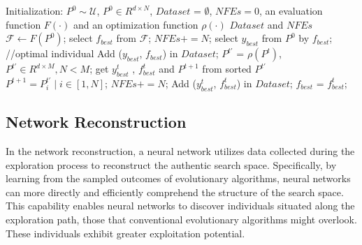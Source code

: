 \documentclass[journal,twoside]{IEEEtran}
\begin{document}
\begin{algorithm}[t]
	\caption{\textcolor{blue}{Exploration Sampling}} 
	\label{exploration} 
	\renewcommand{\algorithmicrequire}{\textbf{Input:}}
	\renewcommand{\algorithmicensure}{\textbf{Output:}}
	\begin{algorithmic}[1]
		\REQUIRE Initialization: $P^{0} \sim \mathcal{U}$, $P^{0} \in R^{d \times N}$, $Dataset$ = $\emptyset$, $N\!F\!E\!s = 0$, an evaluation function $F(\cdot)$ and an optimization function $\rho(\cdot)$
		\ENSURE $Dataset$ and $N\!F\!E\!s$
		\STATE $\mathcal{F} \leftarrow F(P^{0})$; 
		\STATE select $f_{best}$ from $\mathcal{F}$;
		\STATE $N\!F\!E\!s += N$;
		\STATE select $y_{best}$ from $P^{0}$ by $f_{best}$; //optimal individual 
		\STATE Add ($y_{best}$, $f_{best}$) in $Dataset$;
		\STATE $P^{t'}$ = $\rho(P^{t})$, $P^{t'} \in R^{d \times M}, N<M$;
		\STATE get $y_{best}^{t}$ , $f_{best}^{t}$ and $P^{t+1}$ from sorted $P^{t'}$\\ 
		$P^{t+1} = {P^{t'}_{i} \mid i \in [1, N]}$;
		\STATE	$N\!F\!E\!s += N$;
		\STATE	Add ($y^{t}_{best}$, $f^{t}_{best}$) in $Dataset$;
		\STATE  $f_{best}$ = $f_{best}^{t}$;
		\ENDIF	
		\ENDFOR
	\end{algorithmic} 
\end{algorithm}

\subsection{Network Reconstruction}
In the network reconstruction, a neural network utilizes data collected during the exploration process to reconstruct the authentic search space. Specifically, by learning from the sampled outcomes of evolutionary algorithms, neural networks can more directly and efficiently comprehend the structure of the search space. This capability enables neural networks to discover individuals situated along the exploration path, those that conventional evolutionary algorithms might overlook. These individuals exhibit greater exploitation potential.
\end{document}
